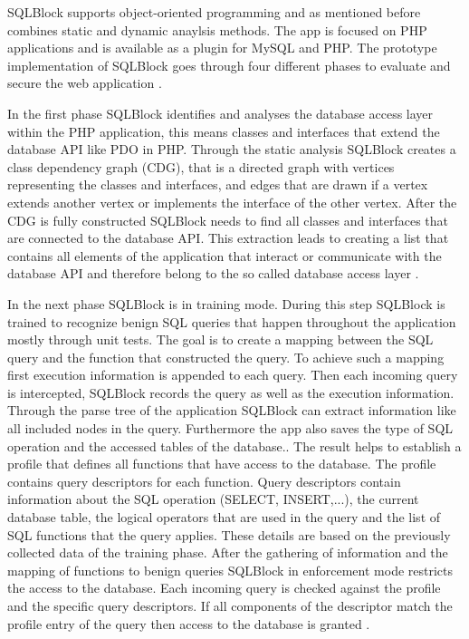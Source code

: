 SQLBlock supports object-oriented programming and as mentioned before combines static and dynamic anaylsis methods. The app is focused on PHP applications and is available as a plugin for MySQL and PHP. The prototype implementation of SQLBlock goes through four different phases to evaluate and secure the web application \autocite[1, 5]{Jahanshahi2018}.\newline


In the first phase SQLBlock identifies and analyses the database access layer within the PHP application, this means classes and interfaces that extend the database API like PDO in PHP. Through the static analysis SQLBlock creates a class dependency graph (CDG), that is a directed graph with vertices representing the classes and interfaces, and edges that are drawn if a vertex extends another vertex or implements the interface of the other vertex. After the CDG is fully constructed SQLBlock needs to find all classes and interfaces that are connected to the database API. This extraction leads to creating a list that contains all elements of the application that interact or communicate with the database API and therefore belong to the so called database access layer \autocite[3, 6]{Jahanshahi2018}.\newline


In the next phase SQLBlock is in training mode. During this step SQLBlock is trained to recognize benign SQL queries that happen throughout the application mostly through unit tests. The goal is to create a mapping between the SQL query and the function that constructed the query. To achieve such a mapping first execution information is appended to each query. Then each incoming query is intercepted, SQLBlock records the query as well as the execution information. Through the parse tree of the application SQLBlock can extract information like all included nodes in the query. Furthermore the app also saves the type of SQL operation and the accessed tables of the database.\autocite[6]{Jahanshahi2018}. The result helps to establish a profile that defines all functions that have access to the database. The profile contains query descriptors for each function. Query descriptors contain information about the SQL operation (SELECT, INSERT,...), the current database table, the logical operators that are used in the query and the list of SQL functions that the query applies. These details are based on the previously collected data of the training phase. After the gathering of information and the mapping of functions to benign queries SQLBlock in enforcement mode restricts the access to the database. Each incoming query is checked against the profile and the specific query descriptors. If all components of the descriptor match the profile entry of the query then access to the database is granted \autocite[7]{Jahanshahi2018}.\newline

